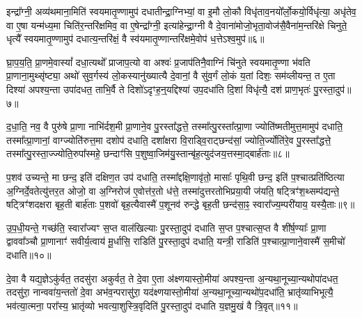 {\anuvakamend[{कॢप्त्या॑ उप॒धाय॑ प्राण॒भृतः॒ सम॑नसः कृ॒ष्णे पुरु॑षो॒ वय॒ इति॒ पञ्च॑ च॥१॥}]}

इन्द्रा᳚ग्नी॒ अव्य॑थमाना॒मिति॑ स्वयमातृ॒ण्णामुप॑ दधातीन्द्रा॒ग्निभ्यां॒ वा इ॒मौ लो॒कौ विधृ॑ताव॒नयो᳚र्लो॒कयो॒र्विधृ॑त्या॒ अधृ॑तेव॒ वा ए॒षा यन्म॑ध्य॒मा चिति॑र॒न्तरि॑क्षमिव॒ वा ए॒षेन्द्रा᳚ग्नी॒ इत्या॑हेन्द्रा॒ग्नी वै दे॒वाना॑मोजो॒भृता॒वोज॑सै॒वैना॑\-म॒न्तरि॑क्षे चिनुते॒ धृत्यै᳚ स्वयमातृ॒ण्णामुप॑ दधात्य॒न्तरि॑क्षं॒ वै स्व॑यमातृ॒ण्णान्तरि॑क्षमे॒वोप॑ ध॒त्ते\-ऽश्व॒मुप॑॥६॥

घ्रा॒प॒य॒ति॒ प्रा॒णमे॒वास्यां᳚ दधा॒त्यथो᳚ प्राजाप॒त्यो वा अश्वः॑ प्र॒जाप॑तिनै॒वाग्निं चि॑नुते स्वयमातृ॒ण्णा भ॑वति प्रा॒णाना॒मुथ्सृ॑ष्ट्या॒ अथो॑ सुव॒र्गस्य॑ लो॒कस्यानु॑ख्यात्यै दे॒वानां॒ वै सु॑व॒र्गं लो॒कं य॒तां दिशः॒ सम॑व्लीयन्त॒ त ए॒ता दिश्या॑ अपश्य॒न्ता उपा॑दधत॒ ताभि॒र्वै ते दिशो॑\-ऽदृꣳह॒न्॒यद्दिश्या॑ उप॒दधा॑ति दि॒शां विधृ॑त्यै॒ दश॑ प्राण॒भृतः॑ पु॒रस्ता॒दुप॑॥७॥

द॒धा॒ति॒ नव॒ वै पुरु॑षे प्रा॒णा नाभि॑र्दश॒मी प्रा॒णाने॒व पु॒रस्ता᳚द्धत्ते॒ तस्मा᳚त्पु॒रस्ता᳚त्प्रा॒णा ज्योति॑ष्मतीमुत्त॒मामुप॑ दधाति॒ तस्मा᳚त्प्रा॒णानां॒ वाग्ज्योति॑रुत्त॒मा दशोप॑ दधाति॒ दशा᳚क्षरा वि॒राड्वि॒राट्छन्द॑सां॒ ज्योति॒र्ज्योति॑रे॒व पु॒रस्ता᳚द्धत्ते॒ तस्मा᳚त्पु॒रस्ता॒ज्ज्योति॒रुपा᳚स्महे॒ छन्दाꣳ॑सि प॒शुष्वा॒जिम॑यु॒स्तान्बृ॑ह॒त्युद॑जय॒त्तस्मा॒द्बार्\mbox{}ह॑ताः॥८॥

प॒शव॑ उच्यन्ते॒ मा छन्द॒ इति॑ दक्षिण॒त उप॑ दधाति॒ तस्मा᳚द्दक्षि॒णावृ॑तो॒ मासाः᳚ पृथि॒वी छन्द॒ इति॑ प॒श्चात्प्रति॑ष्ठित्या अ॒ग्निर्दे॒वतेत्यु॑त्तर॒त ओजो॒ वा अ॒ग्निरोज॑ ए॒वोत्त॑र॒तो ध॑त्ते॒ तस्मा॑दुत्तरतोभिप्रया॒यी ज॑यति॒ षट्त्रिꣳ॑श॒थ्सम्प॑द्यन्ते॒ षट्त्रिꣳ॑शदक्षरा बृह॒ती बार्\mbox{}ह॑ताः प॒शवो॑ बृह॒त्यैवास्मै॑ प॒शूनव॑ रुन्द्धे बृह॒ती छन्द॑सा॒ꣴ॒ स्वारा᳚ज्य॒म्परी॑याय॒ यस्यै॒ताः॥९॥

उ॒प॒धी॒यन्ते॒ गच्छ॑ति॒ स्वारा᳚ज्यꣳ स॒प्त वाल॑खिल्याः पु॒रस्ता॒दुप॑ दधाति स॒प्त प॒श्चात्स॒प्त वै शी॑र्\mbox{}ष॒ण्याः᳚ प्रा॒णा द्वाववा᳚ञ्चौ प्रा॒णानाꣳ॑ सवीर्य॒त्वाय॑ मू॒र्धासि॒ राडिति॑ पु॒रस्ता॒दुप॑ दधाति॒ यन्त्री॒ राडिति॑ प॒श्चात्प्रा॒णाने॒वास्मै॑ स॒मीचो॑ दधाति॥१०॥

{}

दे॒वा वै यद्य॒ज्ञे\-ऽकु॑र्वत॒ तदसु॑रा अकुर्वत॒ ते दे॒वा ए॒ता अ॑क्ष्णयास्तो॒मीया॑ अपश्य॒न्ता अ॒न्यथा॒नूच्या॒न्यथोपा॑दधत॒ तदसु॑रा॒ नान्ववा॑य॒न्ततो॑ दे॒वा अभ॑व॒न्परासु॑रा॒ यद॑क्ष्णयास्तो॒मीया॑ अ॒न्यथा॒नूच्या॒न्यथो॑प॒दधा॑ति॒ भ्रातृ॑व्याभिभूत्यै॒ भव॑त्या॒त्मना॒ परा᳚स्य॒ भ्रातृ॑व्यो भवत्या॒शुस्त्रि॒वृदिति॑ पु॒रस्ता॒दुप॑ दधाति य॒ज्ञमु॒खं वै त्रि॒वृत्॥११॥


